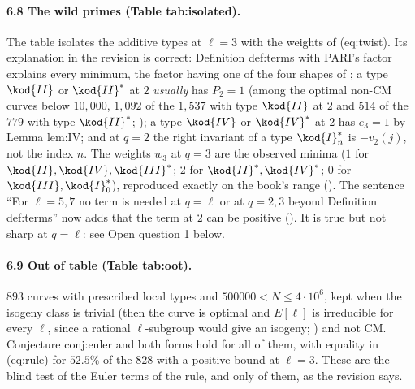 \begin{sloppypar}
\paragraph{6.8 The wild primes (Table tab:isolated).} The table isolates the additive types at $\ell=3$ with the weights of (eq:twist). Its explanation in the revision is correct:
Definition def:terms with PARI's factor explains every minimum, the factor having one of the four shapes of ; a type $\kod{II}$ or $\kod{II}^*$ at $2$ \emph{usually} has
$P_2=1$ (among the optimal non-CM curves below $10{,}000$, $1{,}092$ of the $1{,}537$ with type $\kod{II}$ at $2$ and $514$ of the $779$ with type $\kod{II}^*$; ); a type $\kod{IV}$ or $\kod{IV}^*$ at $2$ has $e_3=1$ by Lemma lem:IV; and at
$q=2$ the right invariant of a type $\kod{I}_n^*$ is $-v_2(j)$, not the index $n$. The weights $w_3$ at $q=3$ are the observed minima ($1$ for $\kod{II},\kod{IV},\kod{III}^*$; $2$ for $\kod{II}^*,\kod{IV}^*$; $0$ for
$\kod{III},\kod{I}_0^*$), reproduced exactly on the book's range (). The sentence ``For $\ell=5,7$ no term is needed at $q=\ell$ or at $q=2,3$ beyond Definition def:terms''
now adds that the term at $2$ can be positive (). It is true but not sharp at $q=\ell$: see Open question 1 below.

\paragraph{6.9 Out of table (Table tab:oot).} $893$ curves with prescribed local types and $500000<N\le4\cdot10^6$, kept when the isogeny class is trivial (then the curve is optimal and $E[\ell]$ is
irreducible for every $\ell$, since a rational $\ell$-subgroup would give an isogeny; ) and not CM. Conjecture conj:euler and both forms hold for all of them, with equality in
(eq:rule) for $52.5\%$ of the $828$ with a positive bound at $\ell=3$. These are the blind test of the Euler terms of the rule, and only of them, as the revision says.


\end{sloppypar}
